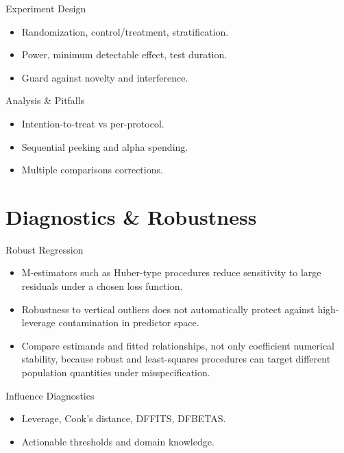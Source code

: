 \documentclass[aspectratio=169]{beamer}
\begin{document}
\begin{frame}{Experiment Design}
\begin{itemize}
  \item Randomization, control/treatment, stratification.
  \item Power, minimum detectable effect, test duration.
  \item Guard against novelty and interference.
\end{itemize}
\end{frame}

\begin{frame}{Analysis \& Pitfalls}
\begin{itemize}
  \item Intention-to-treat vs per-protocol.
  \item Sequential peeking and alpha spending.
  \item Multiple comparisons corrections.
\end{itemize}
\end{frame}

\section{Diagnostics \& Robustness}

\begin{frame}{Robust Regression}
\begin{itemize}
  \item M-estimators such as Huber-type procedures reduce sensitivity to large residuals under a chosen loss function.
  \item Robustness to vertical outliers does not automatically protect against high-leverage contamination in predictor space.
  \item Compare estimands and fitted relationships, not only coefficient numerical stability, because robust and least-squares procedures can target different population quantities under misspecification.
\end{itemize}
\end{frame}

\begin{frame}{Influence Diagnostics}
\begin{itemize}
  \item Leverage, Cook’s distance, DFFITS, DFBETAS.
  \item Actionable thresholds and domain knowledge.
\end{itemize}
\end{frame}
\end{document}
